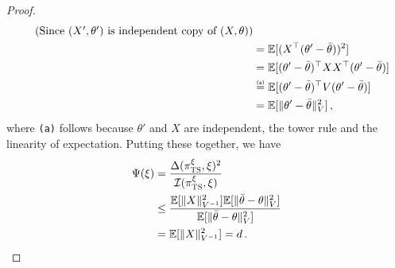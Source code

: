 \documentclass[letter, 12pt]{report}
\newcommand{\explan}[1]{\stackrel{\text{\tiny \texttt{#1}}}}
\newcommand{\E}{\mathbb E}
\newcommand{\I}{\mathcal{I}}
\newcommand{\1}{\mathbf{1}}
\newcommand{\ts}{\textsc{TS}\xspace}
\theoremstyle{plain}
\theoremstyle{definition}
\theoremstyle{remark}
\begin{document}
\begin{proof}
\begin{align*}
        \tag{Since $(X', \theta')$ is independent copy of $(X, \theta)$}
        \\
         & =
        \E[(X^\top (\theta' - \bar{\theta}))^2]                             \\
         & =
        \E[(\theta' - \bar{\theta})^\top X X^\top (\theta' - \bar{\theta})] \\
         &
        \explan{(a)}
        =
        \E[(\theta' - \bar{\theta})^\top V (\theta' - \bar{\theta})]        \\
         & =
        \E[\|\theta' - \bar{\theta}\|_V^2]\,,
    \end{align*}
    where \texttt{(a)} follows because $\theta'$ and $X$ are independent,
    the tower rule and the linearity of expectation.
    Putting these together, we have
    \begin{align*}
        \Psi(\xi)
         & =
        \frac{\Delta(\pi^\xi_\ts, \xi)^2}{\I(\pi^\xi_\ts, \xi)}
        \\
         & \leq
        \frac{
        \E[\|X\|^2_{V^{-1}}]
        \E[\|\bar{\theta} - \theta\|^2_{V}]
        }{
        \E[\|\bar{\theta} - \theta\|^2_{V}]
        }
        \\
         & =
        \E[\|X\|^2_{V^{-1}}]
        =d\,.\qedhere
    \end{align*}
\end{proof}
\end{document}
